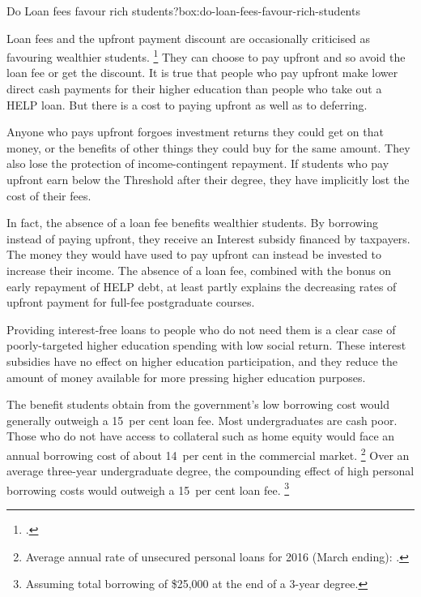 \documentclass[embargoed]{grattan}
\begin{document}
\begin{smallbox}{Do \gls{Loan fees} favour rich students?}{box:do-loan-fees-favour-rich-students}

\Gls{Loan fees} and the upfront payment discount are occasionally criticised as favouring wealthier students.%
\footcites{Hare-2015-loan-fees-advantage-the-rich}{Evans2011MediareleaseGillard} %
They can choose to pay upfront and so avoid the loan fee or get the discount.
It is true that people who pay upfront make lower direct cash payments for their higher education than people who take out a \gls{HELP} loan.
But there is a cost to paying upfront as well as to deferring.

Anyone who pays upfront forgoes investment returns they could get on that money, or the benefits of other things they could buy for the same amount.
They also lose the protection of income-contingent repayment.
If students who pay upfront earn below the \gls{Threshold} after their degree, they have implicitly lost the cost of their fees.

In fact, the absence of a loan fee benefits wealthier students.
By borrowing instead of paying upfront, they receive an \gls{Interest subsidy} financed by taxpayers.
The money they would have used to pay upfront can instead be invested to increase their income.
The absence of a loan fee, combined with the bonus on early repayment of \gls{HELP} debt, at least partly explains the decreasing rates of upfront payment for full-fee postgraduate courses.

Providing interest-free loans to people who do not need them is a clear case of poorly-targeted higher education spending with low social return.
These interest subsidies have no effect on higher education participation, and they reduce the amount of money available for more pressing higher education purposes.
\end{smallbox}

The benefit students obtain from the government's low borrowing cost would generally outweigh a 15~per cent loan fee.
Most undergraduates are cash poor.
Those who do not have access to collateral such as home equity would face an annual borrowing cost of about 14~per cent in the commercial market.%
\footnote{Average annual rate of unsecured personal loans for 2016 (March ending): \textcite{RBA2016F5Indicatorlending}.} Over an average three-year undergraduate degree, the compounding effect of high personal borrowing costs would outweigh a 15~per cent loan fee.%
\CenturyFootnote\footnote{Assuming total borrowing of \$25,000 at the end of a 3-year degree.} 
\end{document}
